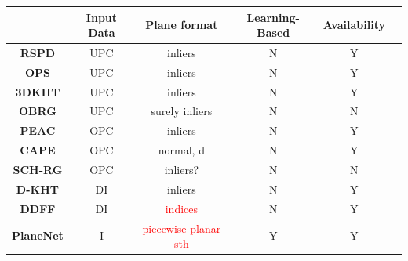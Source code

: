 \documentclass[main.tex]{subfiles}
\begin{document}
\begin{table}[!h]
    \centering
    \begin{tabular}{|c|c|c|c|c|c}
        \hline
                                                                         & \textbf{Input Data} & \textbf{Plane format}                 & \textbf{Learning-Based} & \textbf{Availability} \\ \hline
        \textbf{RSPD} \cite{Araújo_Oliveira_2020}                        & UPC                 & inliers                               & N                       & Y                     \\ \hline
        \textbf{OPS} \cite{Sun_Mordohai_2019}                            & UPC                 & inliers                               & N                       & Y                     \\ \hline
        \textbf{3DKHT} \cite{Limberger_Oliveira_2015}                    & UPC                 & inliers                               & N                       & Y                     \\ \hline
        \textbf{OBRG} \cite{Vo_Truong-Hong_Laefer_Bertolotto_2015}       & UPC                 & surely inliers                        & N                       & N                     \\ \hline
        \textbf{PEAC} \cite{Feng_Taguchi_Kamat_2014}                     & OPC                 & inliers                               & N                       & Y                     \\ \hline
        \textbf{CAPE} \cite{Proença_Gao_2018}                            & OPC                 & normal, d                             & N                       & Y                     \\ \hline
        \textbf{SCH-RG} \cite{Mols_Li_Hanebeck_2020}                     & OPC                 & inliers?                              & N                       & N                     \\ \hline
        \textbf{D-KHT}  \cite{Vera_Lucio_Fernandes_Velho_2018}           & DI                  & inliers                               & N                       & Y                     \\ \hline
        \textbf{DDFF} \cite{Roychoudhury_Missura_Bennewitz_2021}         & DI                  & \textcolor{red}{indices}              & N                       & Y                     \\ \hline
        \textbf{PlaneNet} \cite{Liu_Yang_Ceylan_Yumer_Furukawa_2018}     & I                   & \textcolor{red}{piecewise planar sth} & Y                       & Y                     \\ \hline

\end{tabular}
\end{table}
\end{document}
